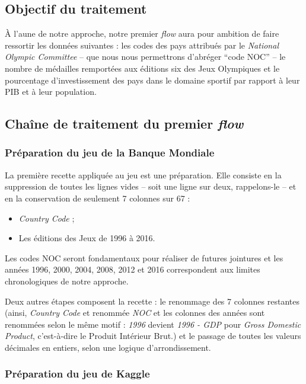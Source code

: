 \documentclass[hidelinks, 12pt]{article}
\begin{document}
\subsection{Objectif du traitement}

À l'aune de notre approche, notre premier \emph{flow} aura pour ambition de faire ressortir les données suivantes : les codes des pays attribués par le \emph{National Olympic Committee} -- que nous nous permettrons d'abréger \enquote{code NOC} -- le nombre de médailles remportées aux éditions six des Jeux Olympiques et le pourcentage d'investissement des pays dans le domaine sportif par rapport à leur PIB et à leur population.


\subsection{Chaîne de traitement du premier \emph{flow}}

\subsubsection{Préparation du jeu de la Banque Mondiale}

La première recette appliquée au jeu est une préparation. Elle consiste en la suppression de toutes les lignes vides -- soit une ligne sur deux, rappelons-le -- et en la conservation de seulement 7 colonnes sur 67 :
\begin{itemize}
	\item \emph{Country Code} ;
	\item Les éditions des Jeux de 1996 à 2016.
\end{itemize}
Les codes NOC seront fondamentaux pour réaliser de futures jointures et les années 1996, 2000, 2004, 2008, 2012 et 2016 correspondent aux limites chronologiques de notre approche.

Deux autres étapes composent la recette : le renommage des 7 colonnes restantes (ainsi, \emph{Country Code } et renommée \emph{NOC} et les colonnes des années sont renommées selon le même motif : \emph{1996} devient \emph{1996 - GDP} pour \emph{Gross Domestic Product}, c'est-à-dire le Produit Intérieur Brut.) et le passage de toutes les valeurs décimales en entiers, selon une logique d'arrondissement. 

\subsubsection{Préparation du jeu de Kaggle}
\end{document}
